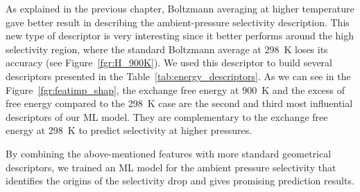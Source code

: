 \documentclass[main]{subfiles}
\begin{document}
As explained in the previous chapter, Boltzmann averaging at higher temperature gave better result in describing the ambient-pressure selectivity description. 
This new type of descriptor is very interesting since it better performs around the high selectivity region, where the standard Boltzmann average at \SI{298}{\kelvin} loses its accuracy (see Figure~\ref{fgr:H_900K}). We used this descriptor to build several descriptors presented in the Table~\ref{tab:energy_descriptors}. As we can see in the Figure~\ref{fgr:featimp_shap}, the exchange free energy at \SI{900}{\kelvin} and the excess of free energy compared to the \SI{298}{\kelvin} case are the second and third most influential descriptors of our ML model. They are complementary to the exchange free energy at \SI{298}{\kelvin} to predict selectivity at higher pressures.

By combining the above-mentioned features with more standard geometrical descriptors, we trained an ML model for the ambient pressure selectivity that identifies the origins of the selectivity drop and gives promising prediction results.

\clearpage
\end{document}
